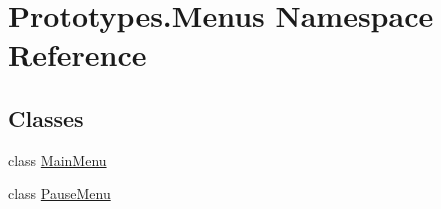 \hypertarget{namespace_prototypes_1_1_menus}{}\section{Prototypes.\+Menus Namespace Reference}
\label{namespace_prototypes_1_1_menus}
\subsection*{Classes}
\begin{DoxyCompactItemize}
\item 
class \mbox{\hyperlink{class_prototypes_1_1_menus_1_1_main_menu}{Main\+Menu}}
\item 
class \mbox{\hyperlink{class_prototypes_1_1_menus_1_1_pause_menu}{Pause\+Menu}}
\end{DoxyCompactItemize}
